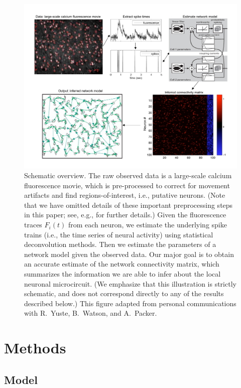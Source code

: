 \documentclass[aoas,preprint]{imsart}
\begin{document}
\begin{figure}[t!]
	\centering
	\includegraphics[width=\hsize]{../figs/yuri-paper-schematic}
	\caption{Schematic overview. The raw observed data is a
	large-scale calcium fluorescence movie, which is pre-processed
	to correct for movement artifacts and find
	regions-of-interest, i.e., putative neurons.  (Note that we
	have omitted details of these important preprocessing steps in
	this paper; see, e.g., \cite{CAR03,DombeckTank07} for further
	details.)  Given the fluorescence traces $F_i(t)$ from each
	neuron, we estimate the underlying spike trains (i.e., the
	time series of neural activity) using statistical
	deconvolution methods.  Then we estimate the parameters of a
	network model given the observed data.  Our major goal is to
	obtain an accurate estimate of the network connectivity
	matrix, which summarizes the information we are able to infer
	about the local neuronal microcircuit.  (We emphasize that
	this illustration is strictly schematic, and does not
	correspond directly to any of the results described below.)
	This figure adapted from personal communications with R.\
	Yuste, B.\ Watson, and A.\ Packer.}

	\label{fig:data_schematic}
\end{figure}


\section{Methods}
\label{sec:methods}
\subsection{Model}
\label{sec:methods:markov-setup}
\end{document}
